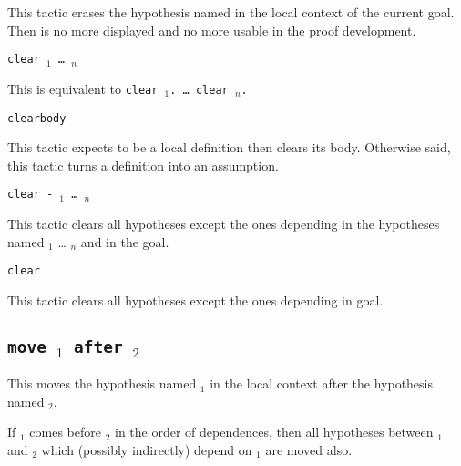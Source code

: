 This tactic erases the hypothesis named {\ident} in the local context
of the current goal. Then {\ident} is no more displayed and no more
usable in the proof development.

\begin{Variants}

\item {\tt clear {\ident$_1$} {\ldots} {\ident$_n$}}
  
  This is equivalent to {\tt clear {\ident$_1$}. {\ldots} clear
    {\ident$_n$}.}
  
\item {\tt clearbody {\ident}}

  This tactic expects {\ident} to be a local definition then clears
  its body. Otherwise said, this tactic turns a definition into an
  assumption.

\item \texttt{clear - {\ident$_1$} {\ldots} {\ident$_n$}}

  This tactic clears all hypotheses except the ones depending in 
  the hypotheses named {\ident$_1$} {\ldots} {\ident$_n$} and in the
  goal.

\item \texttt{clear}

  This tactic clears all hypotheses except the ones depending in 
  goal.

\end{Variants}

\begin{ErrMsgs}
\item {}
\item {} 
\item {} 
\end{ErrMsgs}

\subsection{\tt move {\ident$_1$} after {\ident$_2$}
\label{move}}

This moves the hypothesis named {\ident$_1$} in the local context
after the hypothesis named {\ident$_2$}.

If {\ident$_1$} comes before {\ident$_2$} in the order of dependences,
then all hypotheses between {\ident$_1$} and {\ident$_2$} which
(possibly indirectly) depend on {\ident$_1$} are moved also.

